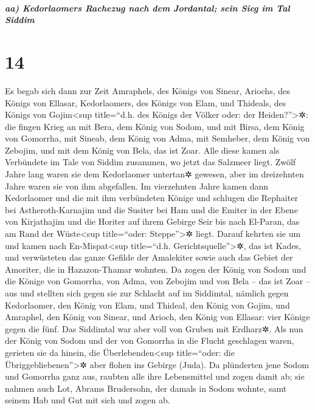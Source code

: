\hypertarget{aa-kedorlaomers-rachezug-nach-dem-jordantal-sein-sieg-im-tal-siddim}{%
\subparagraph{aa) Kedorlaomers Rachezug nach dem Jordantal; sein Sieg im
Tal
Siddim}\label{aa-kedorlaomers-rachezug-nach-dem-jordantal-sein-sieg-im-tal-siddim}}

\hypertarget{section-13}{%
\section{14}\label{section-13}}

 Es begab sich dann zur Zeit Amraphels, des Königs von
Sinear, Ariochs, des Königs von Ellasar, Kedorlaomers, des Königs von
Elam, und Thideals, des Königs von Gojim\textless sup title=``d.h. des
Königs der Völker oder: der Heiden?''\textgreater✲:  die
fingen Krieg an mit Bera, dem König von Sodom, und mit Birsa, dem König
von Gomorrha, mit Sineab, dem König von Adma, mit Semheber, dem König
von Zebojim, und mit dem König von Bela, das ist Zoar. 
Alle diese kamen als Verbündete im Tale von Siddim zusammen, wo jetzt
das Salzmeer liegt.  Zwölf Jahre lang waren sie dem
Kedorlaomer untertan✲ gewesen, aber im dreizehnten Jahre waren sie von
ihm abgefallen.  Im vierzehnten Jahre kamen dann
Kedorlaomer und die mit ihm verbündeten Könige und schlugen die
Rephaiter bei Astheroth-Karnajim und die Susiter bei Ham und die Emiter
in der Ebene von Kirjathajim  und die Horiter auf ihrem
Gebirge Seir bis nach El-Paran, das am Rand der Wüste\textless sup
title=``oder: Steppe''\textgreater✲ liegt.  Darauf kehrten
sie um und kamen nach En-Mispat\textless sup title=``d.h.
Gerichtsquelle''\textgreater✲, das ist Kades, und verwüsteten das ganze
Gefilde der Amalekiter sowie auch das Gebiet der Amoriter, die in
Hazazon-Thamar wohnten.  Da zogen der König von Sodom und
die Könige von Gomorrha, von Adma, von Zebojim und von Bela -- das ist
Zoar -- aus und stellten sich gegen sie zur Schlacht auf im Siddimtal,
 nämlich gegen Kedorlaomer, den König von Elam, und
Thideal, den König von Gojim, und Amraphel, den König von Sinear, und
Arioch, den König von Ellasar: vier Könige gegen die fünf.
 Das Siddimtal war aber voll von Gruben mit Erdharz✲. Als
nun der König von Sodom und der von Gomorrha in die Flucht geschlagen
waren, gerieten sie da hinein, die Überlebenden\textless sup
title=``oder: die Übriggebliebenen''\textgreater✲ aber flohen ins
Gebirge (Juda).  Da plünderten jene Sodom und Gomorrha
ganz aus, raubten alle ihre Lebensmittel und zogen damit ab;
 sie nahmen auch Lot, Abrams Brudersohn, der damals in
Sodom wohnte, samt seinem Hab und Gut mit sich und zogen ab.

